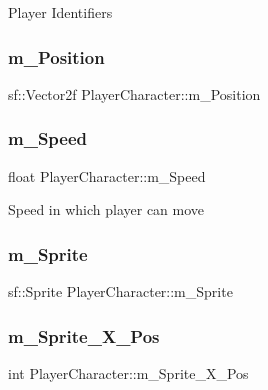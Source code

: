 Player Identifiers \hypertarget{class_player_character_a551aaac5dacaebbde21c5b6d46f5ec7d}{}\label{class_player_character_a551aaac5dacaebbde21c5b6d46f5ec7d} 
\subsubsection{\texorpdfstring{m\+\_\+\+Position}{m\_Position}}
{\footnotesize\ttfamily sf\+::\+Vector2f Player\+Character\+::m\+\_\+\+Position\hspace{0.3cm}{\ttfamily [protected]}}

\hypertarget{class_player_character_af4dcd4c48904565edaad6274897991a8}{}\label{class_player_character_af4dcd4c48904565edaad6274897991a8} 
\subsubsection{\texorpdfstring{m\+\_\+\+Speed}{m\_Speed}}
{\footnotesize\ttfamily float Player\+Character\+::m\+\_\+\+Speed\hspace{0.3cm}{\ttfamily [protected]}}

Speed in which player can move \hypertarget{class_player_character_a65d271da64e077967d283b37396d1549}{}\label{class_player_character_a65d271da64e077967d283b37396d1549} 
\subsubsection{\texorpdfstring{m\+\_\+\+Sprite}{m\_Sprite}}
{\footnotesize\ttfamily sf\+::\+Sprite Player\+Character\+::m\+\_\+\+Sprite\hspace{0.3cm}{\ttfamily [protected]}}

\hypertarget{class_player_character_a8bf6864a7377ccafda31172a6e5b009d}{}\label{class_player_character_a8bf6864a7377ccafda31172a6e5b009d} 
\subsubsection{\texorpdfstring{m\+\_\+\+Sprite\+\_\+\+X\+\_\+\+Pos}{m\_Sprite\_X\_Pos}}
{\footnotesize\ttfamily int Player\+Character\+::m\+\_\+\+Sprite\+\_\+\+X\+\_\+\+Pos\hspace{0.3cm}{\ttfamily [protected]}}

